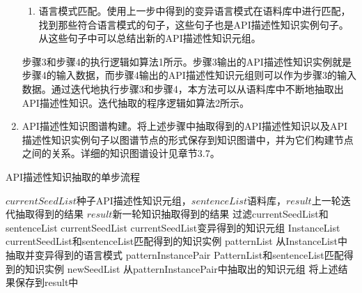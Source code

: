 \begin{enumerate}
\begin{enumerate}
        \item 语言模式匹配。使用上一步中得到的变异语言模式在语料库中进行匹配，找到那些符合语言模式的句子，这些句子也是API描述性知识实例句子。从这些句子中可以总结出新的API描述性知识元组。
    \end{enumerate}
    步骤3和步骤4的执行逻辑如算法1所示。步骤3输出的API描述性知识实例就是步骤4的输入数据，而步骤4输出的API描述性知识元组则可以作为步骤3的输入数据。通过迭代地执行步骤3和步骤4，本方法可以从语料库中不断地抽取出API描述性知识。迭代抽取的程序逻辑如算法2所示。
    \item API描述性知识图谱构建。将上述步骤中抽取得到的API描述性知识以及API描述性知识实例句子以图谱节点的形式保存到知识图谱中，并为它们构建节点之间的关系。详细的知识图谱设计见章节3.7。
\end{enumerate}

\renewcommand{\algorithmicrequire}{\textbf{输入:}}  
\renewcommand{\algorithmicensure}{\textbf{输出:}}  
\begin{algorithm}  
    \caption{API描述性知识抽取的单步流程} 
    \begin{algorithmic}[1] %
        \Require $currentSeedList$种子API描述性知识元组，$sentenceList$语料库，$result$上一轮迭代抽取得到的结果
        \Ensure $result$新一轮知识抽取得到的结果
            \State 过滤currentSeedList和sentenceList
            \State currentSeedList \gets currentSeedList变异得到的知识元组
            \State InstanceList \gets currentSeedList和sentenceList匹配得到的知识实例
            \State patternList \gets 从InstanceList中抽取并变异得到的语言模式
            \State patternInstancePair \gets PatternList和sentenceList匹配得到的知识实例
            \State newSeedList \gets 从patternInstancePair中抽取出的知识元组
            \State 将上述结果保存到result中
            \State {}
        \EndFunction  
    \end{algorithmic}  
\end{algorithm} 

